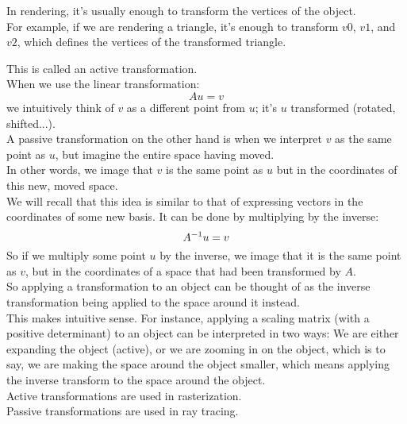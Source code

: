 \documentclass[12pt]{article}
\begin{document}
In rendering, it's usually enough to transform the vertices
of the object. \\
For example, if we are rendering a triangle,
it's enough to transform $v0$, $v1$, and $v2$,
which defines the vertices of the transformed triangle.

This is called an active transformation. \\
When we use the linear transformation:
\[ Au = v \]
we intuitively think of $v$ as a different
point from $u$; it's $u$ transformed (rotated, shifted...). \\

A passive transformation on the other hand is
when we interpret $v$ as the same point as $u$,
but imagine the entire space having moved. \\
In other words, we image that $v$ is the same
point as $u$ but in the coordinates of this new,
moved space. \\
We will recall that this idea is similar to that
of expressing vectors in the coordinates of some new basis.
It can be done by multiplying by the inverse:
\[ A^{-1} u = v \]
So if we multiply some point $u$ by the inverse,
we image that it is the same point as $v$,
but in the coordinates of a space that had been transformed
by $A$. \\
So applying a transformation to an object
can be thought of as the inverse transformation
being applied to the space around it instead. \\

This makes intuitive sense.
For instance, applying a scaling matrix
(with a positive determinant) to an object
can be interpreted in two ways:
We are either expanding the object
(active),
or we are zooming in on the object,
which is to say,
we are making the space around the object smaller,
which means applying the inverse transform to
the space around the object. \\

Active transformations are used in rasterization. \\
Passive transformations are used in ray tracing. \\
\end{document}
